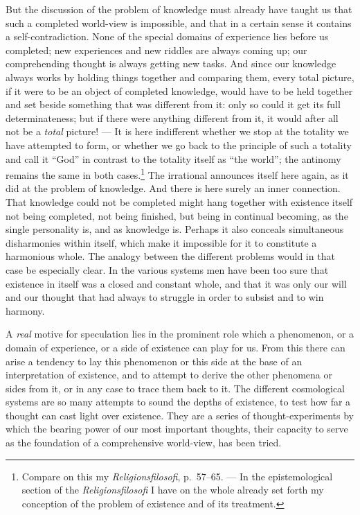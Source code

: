 \documentclass[12pt,a4paper]{book}
\newcommand{\opage}[1]{\marginnote{\footnotesize\textit{[#1]}}}
\begin{document}
But the discussion of the problem of knowledge must already have taught us that
such a completed world-view is impossible, and that in a certain sense it
contains a self-contradiction. None of the special domains of experience lies
before us completed; new experiences and new riddles are always coming up; our
comprehending thought is always getting new tasks. And since our knowledge always
works by holding things together and comparing them, every total picture, if it
were to be an object of completed knowledge, would have to be held together and
set beside something that was different from it: only so could it get its full
determinateness; but if there were anything different from it, it would after all
not be a \emph{total} picture! --- It is here indifferent whether we stop at the
totality we have attempted to form, or whether we go back to the principle of
such a totality and call it ``God'' in contrast to the totality itself as ``the
world''; the antinomy remains the same in both cases.\footnote{Compare on this my
\textit{Religionsfilosofi}, p.~57--65. --- In the epistemological section of the
\textit{Religionsfilosofi} I have on the whole already set forth my conception of
the problem of existence and of its treatment.} The irrational announces itself
here again, as it did at \opage{55}the problem of knowledge. And there is here surely an
inner connection. That knowledge could not be completed might hang together with
existence itself not being completed, not being finished, but being in continual
becoming, as the single personality is, and as knowledge is. Perhaps it also
conceals simultaneous disharmonies within itself, which make it impossible for it
to constitute a harmonious whole. The analogy between the different problems
would in that case be especially clear. In the various systems men have been too
sure that existence in itself was a closed and constant whole, and that it was
only our will and our thought that had always to struggle in order to subsist and
to win harmony.

A \emph{real} motive for speculation lies in the prominent role which a
phenomenon, or a domain of experience, or a side of existence can play for us.
From this there can arise a tendency to lay this phenomenon or this side at the
base of an interpretation of existence, and to attempt to derive the other
phenomena or sides from it, or in any case to trace them back to it. The
different cosmological systems are so many attempts to sound the depths of
existence, to test how far a thought can cast light over existence. They are a
series of thought-experiments by which the bearing power of our most important
thoughts, their capacity to serve as the foundation of a comprehensive
world-view, has been tried.
\end{document}
